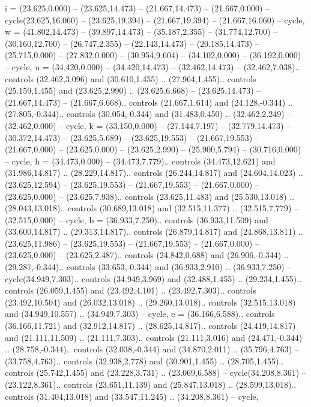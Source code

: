 {i} = {(23.625,0.000) -- (23.625,14.473) -- (21.667,14.473) -- (21.667,0.000) -- cycle(23.625,16.060) -- (23.625,19.394) -- (21.667,19.394) -- (21.667,16.060) -- cycle},
{w} = {(41.802,14.473) -- (39.897,14.473) -- (35.187,2.355) -- (31.774,12.700) -- (30.160,12.700) -- (26.747,2.355) -- (22.143,14.473) -- (20.185,14.473) -- (25.715,0.000) -- (27.832,0.000) -- (30.954,9.604) -- (34.102,0.000) -- (36.192,0.000) -- cycle},
{u} = {(34.420,0.000) -- (34.420,14.473) -- (32.462,14.473) -- (32.462,7.038).. controls (32.462,3.096) and (30.610,1.455) .. (27.964,1.455).. controls (25.159,1.455) and (23.625,2.990) .. (23.625,6.668) -- (23.625,14.473) -- (21.667,14.473) -- (21.667,6.668).. controls (21.667,1.614) and (24.128,-0.344) .. (27.805,-0.344).. controls (30.054,-0.344) and (31.483,0.450) .. (32.462,2.249) -- (32.462,0.000) -- cycle},
{k} = {(33.150,0.000) -- (27.144,7.197) -- (32.779,14.473) -- (30.372,14.473) -- (23.625,5.689) -- (23.625,19.553) -- (21.667,19.553) -- (21.667,0.000) -- (23.625,0.000) -- (23.625,2.990) -- (25.900,5.794) -- (30.716,0.000) -- cycle},
{h} = {(34.473,0.000) -- (34.473,7.779).. controls (34.473,12.621) and (31.986,14.817) .. (28.229,14.817).. controls (26.244,14.817) and (24.604,14.023) .. (23.625,12.594) -- (23.625,19.553) -- (21.667,19.553) -- (21.667,0.000) -- (23.625,0.000) -- (23.625,7.938).. controls (23.625,11.483) and (25.530,13.018) .. (28.043,13.018).. controls (30.689,13.018) and (32.515,11.377) .. (32.515,7.779) -- (32.515,0.000) -- cycle},
{b} = {(36.933,7.250).. controls (36.933,11.509) and (33.600,14.817) .. (29.313,14.817).. controls (26.879,14.817) and (24.868,13.811) .. (23.625,11.986) -- (23.625,19.553) -- (21.667,19.553) -- (21.667,0.000) -- (23.625,0.000) -- (23.625,2.487).. controls (24.842,0.688) and (26.906,-0.344) .. (29.287,-0.344).. controls (33.653,-0.344) and (36.933,2.910) .. (36.933,7.250) -- cycle(34.949,7.303).. controls (34.949,3.969) and (32.488,1.455) .. (29.234,1.455).. controls (26.059,1.455) and (23.492,4.101) .. (23.492,7.303).. controls (23.492,10.504) and (26.032,13.018) .. (29.260,13.018).. controls (32.515,13.018) and (34.949,10.557) .. (34.949,7.303) -- cycle},
{e} = {(36.166,6.588).. controls (36.166,11.721) and (32.912,14.817) .. (28.625,14.817).. controls (24.419,14.817) and (21.111,11.509) .. (21.111,7.303).. controls (21.111,3.016) and (24.471,-0.344) .. (28.758,-0.344).. controls (32.038,-0.344) and (34.870,2.011) .. (35.796,4.763) -- (33.758,4.763).. controls (32.938,2.778) and (30.901,1.455) .. (28.705,1.455).. controls (25.742,1.455) and (23.228,3.731) .. (23.069,6.588) -- cycle(34.208,8.361) -- (23.122,8.361).. controls (23.651,11.139) and (25.847,13.018) .. (28.599,13.018).. controls (31.404,13.018) and (33.547,11.245) .. (34.208,8.361) -- cycle},
